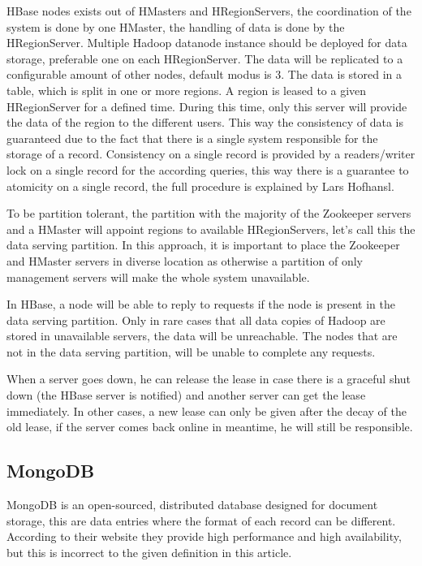 \documentclass[10pt,conference,letterpaper]{IEEEtran}
\begin{document}
HBase nodes exists out of HMasters and HRegionServers, the coordination of the system is done by one HMaster, the handling of data is done by the HRegionServer. Multiple Hadoop datanode instance should be deployed for data storage, preferable one on each HRegionServer. The data will be replicated to a configurable amount of other nodes, default modus is 3. The data is stored in a table, which is split in one or more regions. A region is leased to a given HRegionServer for a defined time. During this time, only this server will provide the data of the region to the different users. This way the consistency of data is guaranteed due to the fact that there is a single system responsible for the storage of a record.  Consistency on a single record is provided by a readers/writer lock on a single record for the according queries, this way there is a guarantee to atomicity on a single record, the full procedure is explained by Lars Hofhansl\cite{hbase-acid}. 

To be partition tolerant, the partition with the majority of the Zookeeper servers and a HMaster will appoint regions to available HRegionServers, let's call this the data serving partition. In this approach, it is important to place the Zookeeper and HMaster servers in diverse location as otherwise a partition of only management servers will make the whole system unavailable. 

In HBase, a node will be able to reply to requests if the node is present in the data serving partition. Only in rare cases that all data copies of Hadoop are stored in unavailable servers, the data will be unreachable. The nodes that are not in the data serving partition, will be unable to complete any requests. 

When a server goes down, he can release the lease in case there is a graceful shut down (the HBase server is notified) and another server can get the lease immediately. In other cases, a new lease can only be given after the decay of the old lease, if the server comes back online in meantime, he will still be responsible. 

\subsection{MongoDB}
MongoDB\cite{mongodb-doc} is an open-sourced, distributed database designed for document storage, this are data entries where the format of each record can be different. According to their website they provide high performance and high availability, but this is incorrect to the given definition in this article. 
\end{document}
